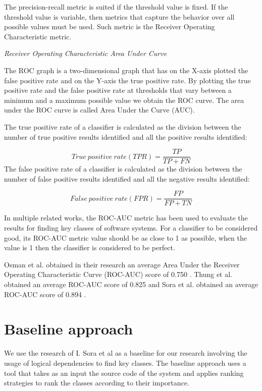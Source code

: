 \documentclass[12pt, a4paper, twoside]{report}
\begin{document}
The precision-recall metric is suited if the threshold value is fixed. If the threshold value is variable, then metrics that capture the behavior over all possible values must be used. Such metric is the Receiver Operating Characteristic metric.

\textit{Receiver Operating Characteristic Area Under Curve}


The ROC graph is a two-dimensional graph that has on the X-axis plotted the false positive rate and on the Y-axis the true positive rate. By plotting the true positive rate and the false positive rate at thresholds that vary between a minimum and a maximum possible value we obtain the ROC curve. The area under the ROC curve is called Area Under the Curve (AUC).

The true positive rate of a classifier is calculated as the division between the number of true positive results identified and all the positive results identified:

\begin{equation}
 True\ positive\ rate (TPR) = \frac{TP}{TP+FN}
\end{equation}
The false positive rate of a classifier is calculated as the division between the number of false positive results identified and all the negative results identified:

\begin{equation}
 False\ positive\ rate (FPR) = \frac{FP}{FP+TN}
\end{equation}


In multiple related works, the ROC-AUC metric has been used to evaluate the results for finding key classes of software systems.
For a classifier to be considered good, its ROC-AUC metric value should be as close to 1 as possible, when the value is 1 then the classifier is considered to be perfect.

Osman et al. obtained in their research an average Area Under the Receiver Operating Characteristic Curve (ROC-AUC) score of 0.750 \cite{6676885}. Thung et al. obtained an average ROC-AUC score of 0.825 \cite{rocclasification}  and Sora et al. obtained an average ROC-AUC score of 0.894 \cite{Finding-key-classes}.

\section{Baseline approach}
\label{sec:previous_measurements}

We use the research of I. Sora et al \cite{Finding-key-classes} as a baseline for our research involving the usage of logical dependencies to find key classes. 
The baseline approach uses a tool that takes as an input the source code of the system and applies ranking strategies to rank the classes according to their importance. 
\end{document}
